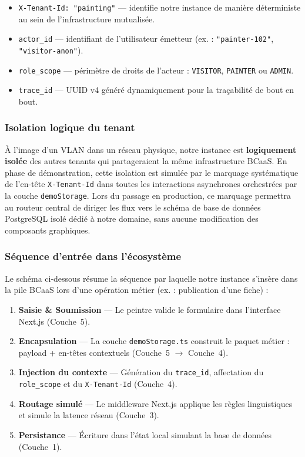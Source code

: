 \documentclass[12pt,a4paper]{report}
\begin{document}
\begin{itemize}
    \item \texttt{X-Tenant-Id: "painting"} --- identifie notre instance de manière déterministe au sein de l'infrastructure mutualisée.
    \item \texttt{actor\_id} --- identifiant de l'utilisateur émetteur (ex. : \texttt{"painter-102"}, \texttt{"visitor-anon"}).
    \item \texttt{role\_scope} --- périmètre de droits de l'acteur : \texttt{VISITOR}, \texttt{PAINTER} ou \texttt{ADMIN}.
    \item \texttt{trace\_id} --- UUID v4 généré dynamiquement pour la traçabilité de bout en bout.
\end{itemize}

\subsubsection{Isolation logique du tenant}

À l'image d'un VLAN dans un réseau physique, notre instance est \textbf{logiquement isolée} des autres tenants qui partageraient la même infrastructure BCaaS. En phase de démonstration, cette isolation est simulée par le marquage systématique de l'en-tête \texttt{X-Tenant-Id} dans toutes les interactions asynchrones orchestrées par la couche \texttt{demoStorage}. Lors du passage en production, ce marquage permettra au routeur central de diriger les flux vers le schéma de base de données PostgreSQL isolé dédié à notre domaine, sans aucune modification des composants graphiques.

\subsubsection{Séquence d'entrée dans l'écosystème}

Le schéma ci-dessous résume la séquence par laquelle notre instance s'insère dans la pile BCaaS lors d'une opération métier (ex. : publication d'une fiche) :

\begin{enumerate}
    \item \textbf{Saisie \& Soumission} --- Le peintre valide le formulaire dans l'interface Next.js (Couche~5).
    \item \textbf{Encapsulation} --- La couche \texttt{demoStorage.ts} construit le paquet métier : payload + en-têtes contextuels (Couche~5 $\rightarrow$ Couche~4).
    \item \textbf{Injection du contexte} --- Génération du \texttt{trace\_id}, affectation du \texttt{role\_scope} et du \texttt{X-Tenant-Id} (Couche~4).
    \item \textbf{Routage simulé} --- Le middleware Next.js applique les règles linguistiques et simule la latence réseau (Couche~3).
    \item \textbf{Persistance} --- Écriture dans l'état local simulant la base de données (Couche~1).
\end{enumerate}
\end{document}
